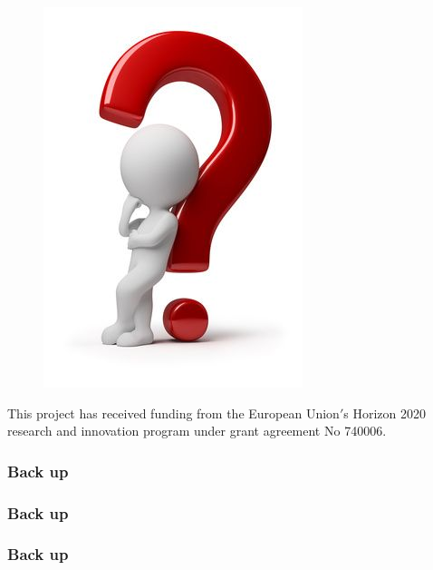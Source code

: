 \documentclass[aspectratio=43]{beamer}
\begin{document}
\begin{frame}


	\begin{figure}
		\includegraphics[width = 2 cm]{plots/final/thinking.png}
	\end{figure}		

	{\small \color{blue} \footnotesize This project has received funding from the European Union$'$s Horizon 2020 research and innovation program under grant agreement No 740006.}

\end{frame}

\begin{frame}

	\frametitle{Back up}

\end{frame}

\begin{frame}

	\frametitle{Back up}

\end{frame}

\begin{frame}

	\frametitle{Back up}

\end{frame}
\end{document}
